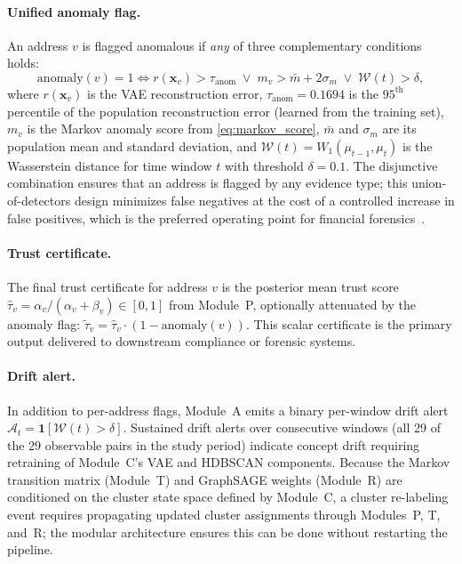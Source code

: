 \paragraph{Unified anomaly flag.}
An address $v$ is flagged anomalous if \emph{any} of three complementary
conditions holds:
\begin{equation}
  \mathrm{anomaly}(v) = 1 \iff
    r(\mathbf{x}_v) > \tau_{\mathrm{anom}}
    \;\lor\;
    m_v > \bar{m} + 2\sigma_m
    \;\lor\;
    \mathcal{W}(t) > \delta,
  \label{eq:anomaly_flag}
\end{equation}
where $r(\mathbf{x}_v)$ is the VAE reconstruction error,
$\tau_{\mathrm{anom}} = 0.1694$ is the $95^{\mathrm{th}}$ percentile of the
population reconstruction error (learned from the training set),
$m_v$ is the Markov anomaly score from \eqref{eq:markov_score},
$\bar{m}$ and $\sigma_m$ are its population mean and standard deviation, and
$\mathcal{W}(t) = W_1(\mu_{t-1}, \mu_t)$ is the Wasserstein distance for
time window $t$ with threshold $\delta = 0.1$.
The disjunctive combination ensures that an address is flagged by any
evidence type; this union-of-detectors design minimizes false negatives at the
cost of a controlled increase in false positives, which is the preferred
operating point for financial forensics~\cite{bahnsen2016fraud}.

\paragraph{Trust certificate.}
The final trust certificate for address $v$ is the posterior mean trust score
$\hat{\tau}_v = \alpha_v / (\alpha_v + \beta_v) \in [0,1]$ from Module~P,
optionally attenuated by the anomaly flag:
$\tilde{\tau}_v = \hat{\tau}_v \cdot (1 - \mathrm{anomaly}(v))$.
This scalar certificate is the primary output delivered to downstream
compliance or forensic systems.

\paragraph{Drift alert.}
In addition to per-address flags, Module~A emits a binary per-window drift
alert $\mathcal{A}_t = \mathbf{1}[\mathcal{W}(t) > \delta]$.
Sustained drift alerts over consecutive windows (all 29 of the 29 observable
pairs in the study period) indicate concept drift requiring retraining of
Module~C's VAE and HDBSCAN components.
Because the Markov transition matrix (Module~T) and GraphSAGE weights
(Module~R) are conditioned on the cluster state space defined by Module~C,
a cluster re-labeling event requires propagating updated cluster assignments
through Modules~P, T, and~R; the modular architecture ensures this can be
done without restarting the pipeline.

